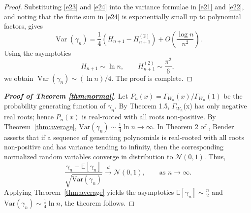 \documentclass[12pt]{article}
\theoremstyle{definition}
\newcommand{\Var}{\operatorname{Var}}
\begin{document}
\begin{proof}
Substituting \eqref{e23} and \eqref{e24} into the variance formulae in \eqref{e21} and \eqref{e22}, and noting that the finite sum in \eqref{e24} is exponentially small up to polynomial factors, gives
\[
\Var(\gamma_n)
=
\frac14\left(H_{n+1}-H_{n+1}^{(2)}\right)
+O\!\left(\frac{\log n}{n^2}\right).
\]
Using the asymptotics
\[
H_{n+1}\sim \ln n,\qquad
H_{n+1}^{(2)}\sim \frac{\pi^2}{6},
\]
we obtain $\Var(\gamma_n)\sim (\ln n)/4$. The proof is complete.
\end{proof}



\begin{proof}[\bf{Proof of Theorem \ref{thm:normal}}]
Let \(P_n(x)=\Gamma_{W_n}(x)/\Gamma_{W_n}(1)\) be the probability generating function of \(\gamma_n\). By Theorem 1.5, \(\Gamma_{W_n}\)(x) has only negative real roots; hence \(P_n(x)\) is real-rooted with all roots non-positive. By Theorem~\ref{thm:average},
\(
\mathrm{Var}(\gamma_n)\sim \frac14\ln n\to\infty.
\)
In Theorem 2 of \cite{Ben73}, Bender asserts that if a sequence of generating polynomials is real-rooted with all roots non-positive and has variance tending to infinity, then the corresponding normalized random variables converge in distribution to \(\mathcal{N}(0,1)\). Thus, \[
\frac{\gamma_n-\mathbb{E}[\gamma_n]}{\sqrt{\mathrm{Var}(\gamma_n)}}\xrightarrow{d}\mathcal{N}(0,1), \qquad\text{as } n\to\infty.
\]
Applying Theorem~\ref{thm:average} yields the asymptotics \(\mathbb{E}[\gamma_n]\sim\frac{n}{2}\) and \(\mathrm{Var}(\gamma_n)\sim\frac14\ln n\), the theorem follows. \end{proof}
\end{document}

